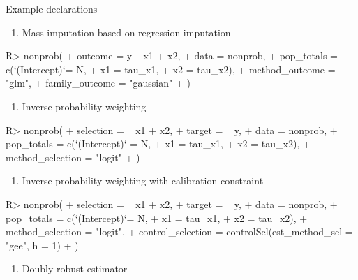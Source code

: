 \documentclass[
]{jss}
\providecommand{\tightlist}{%
  \setlength{\itemsep}{0pt}\setlength{\parskip}{0pt}}
\begin{document}
Example declarations

\begin{enumerate}
\def\labelenumi{\arabic{enumi}.}
\tightlist
\item
  Mass imputation based on regression imputation
\end{enumerate}

\begin{CodeChunk}
\begin{CodeInput}
R> nonprob(
+   outcome = y ~ x1 + x2,
+   data = nonprob,
+   pop_totals = c(`(Intercept)`= N,
+                  x1 = tau_x1,
+                  x2 = tau_x2),
+   method_outcome = "glm",
+   family_outcome = "gaussian"
+ )
\end{CodeInput}
\end{CodeChunk}

\begin{enumerate}
\def\labelenumi{\arabic{enumi}.}
\setcounter{enumi}{1}
\tightlist
\item
  Inverse probability weighting
\end{enumerate}

\begin{CodeChunk}
\begin{CodeInput}
R> nonprob(
+   selection =  ~ x1 + x2, 
+   target = ~ y, 
+   data = nonprob, 
+   pop_totals = c(`(Intercept)` = N, 
+                  x1 = tau_x1, 
+                  x2 = tau_x2), 
+   method_selection = "logit"
+ )
\end{CodeInput}
\end{CodeChunk}

\begin{enumerate}
\def\labelenumi{\arabic{enumi}.}
\setcounter{enumi}{2}
\tightlist
\item
  Inverse probability weighting with calibration constraint
\end{enumerate}

\begin{CodeChunk}
\begin{CodeInput}
R> nonprob(
+   selection =  ~ x1 + x2, 
+   target = ~ y, 
+   data = nonprob, 
+   pop_totals = c(`(Intercept)`= N, 
+                  x1 = tau_x1, 
+                  x2 = tau_x2), 
+   method_selection = "logit", 
+   control_selection = controlSel(est_method_sel = "gee", h = 1)
+ )
\end{CodeInput}
\end{CodeChunk}

\begin{enumerate}
\def\labelenumi{\arabic{enumi}.}
\setcounter{enumi}{3}
\tightlist
\item
  Doubly robust estimator
\end{enumerate}
\end{document}

